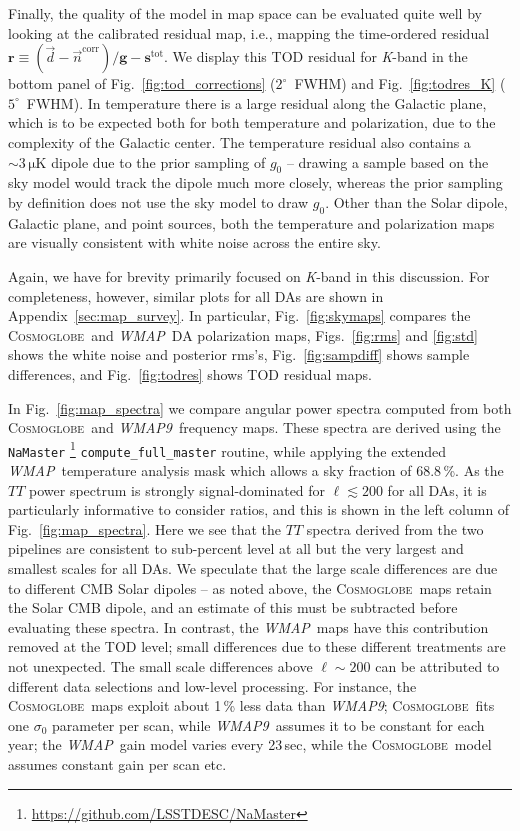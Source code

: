 \documentclass[twocolumn]{../../common/aa}
\def\WMAP{\emph{WMAP}}
\def\WMAPnine{\emph{WMAP9}}
\newcommand{\cosmoglobe}{\textsc{Cosmoglobe}}
\newcommand{\K}[0]{\textit K}
\newcommand{\ncorr}{\vec n^\mathrm{corr}}
\newcommand{\data}{\vec d}
\begin{document}
Finally, the quality of the model in map space can be evaluated quite well by looking at the calibrated residual map, i.e., mapping the time-ordered residual $\boldsymbol r\equiv(\data-\ncorr)/\boldsymbol g-\boldsymbol s^\mathrm{tot}$. We display this TOD residual for \K-band in the bottom panel of Fig.~\ref{fig:tod_corrections} ($2^\circ$~FWHM) and Fig.~\ref{fig:todres_K} ($5^\circ$~FWHM). In temperature there is a large residual along the Galactic plane, which is to be expected both for both temperature and polarization, due to the complexity of the Galactic center. The temperature residual also contains a $\sim3\,\mathrm{\mu K}$ dipole due to the prior sampling of $g_0$ -- drawing a sample based on the sky model would track the dipole much more closely, whereas the prior sampling by definition does not use the sky model to draw $g_0$. Other than the Solar dipole, Galactic plane, and point sources, both the temperature and polarization maps are visually consistent with white noise across the entire sky.

Again, we have for brevity primarily focused on \K-band in this discussion. For completeness, however, similar plots for all DAs are shown in Appendix~\ref{sec:map_survey}. In particular, Fig.~\ref{fig:skymaps} compares the \cosmoglobe\ and \WMAP\ DA polarization maps, Figs.~\ref{fig:rms} and \ref{fig:std} shows the white noise and posterior rms's, Fig.~\ref{fig:sampdiff} shows sample differences, and Fig.~\ref{fig:todres} shows TOD residual maps.

In Fig.~\ref{fig:map_spectra} we compare angular power spectra computed from both  \cosmoglobe\ and \WMAPnine\ frequency maps. These spectra are derived using the \texttt{NaMaster} \citep{namaster}\footnote{\url{https://github.com/LSSTDESC/NaMaster}} \texttt{compute\_full\_master} routine, while applying the extended \WMAP\ temperature analysis mask which allows a sky fraction of 68.8\,\%. As the $TT$ power spectrum is strongly signal-dominated for $\ell\lesssim200$ for all DAs, it is particularly informative to consider ratios, and this is shown in the left column of Fig.~\ref{fig:map_spectra}. Here we see that the $TT$ spectra derived from the two pipelines are consistent to sub-percent level at all but the very largest and smallest scales for all DAs. We speculate that the large scale differences are due to different CMB Solar dipoles -- as noted above, the \cosmoglobe\ maps retain the Solar CMB dipole, and an estimate of this must be subtracted before evaluating these spectra. In contrast, the \WMAP\ maps have this contribution removed at the TOD level; small differences due to these different treatments are not unexpected. The small scale differences above $\ell\sim200$ can be attributed to different data selections and low-level processing. For instance, the \cosmoglobe\ maps exploit about 1\,\% less data than \WMAPnine; \cosmoglobe\ fits one $\sigma_0$ parameter per scan, while \WMAPnine\ assumes it to be constant for each year; the \WMAP\ gain model varies every 23\,sec, while the \cosmoglobe\ model assumes constant gain per scan etc.
\end{document}
